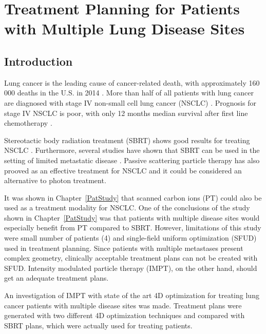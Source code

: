 \chapter{Treatment Planning for Patients with Multiple Lung Disease Sites}
\label{chapter:vmm}
\minitoc

\section{Introduction}

Lung cancer is the leading cause of cancer-related death, with approximately 160 000 deaths in the U.S. in 2014 \cite{Siegel2014}.
More than half of all patients with lung cancer are diagnosed with stage IV non-small cell lung cancer (NSCLC) \cite{Ramalingam2008, Iyengar2014}.
Prognosis for stage IV NSCLC is poor, with only 12 months median survival after first line chemotherapy \cite{Socinski2013}. 

Stereotactic body radiation treatment (SBRT) shows good results for treating NSCLC \cite{Baumann2009, Fakiris2009, Grutters2010, Greco2011}. 
Furthermore, several studies have shown that SBRT can be used in the setting of limited metastatic 
disease \cite{Rusthoven2009, Villaruz2012, Salama2012, Iyengar2014}. 
Passive scattering particle therapy has also prooved as an effective treatment for NSCLC \cite{Grutters2010, Tsujii2012} and it could be considered an alternative
to photon treatment.

It was shown in Chapter~\ref{PatStudy} that scanned carbon ions (PT) could also be used as a treatment modality for NSCLC. One of the conclusions of the study shown in Chapter~\ref{PatStudy} 
was that patients with multiple disease sites would especially benefit from PT compared to SBRT. However, limitations of this study were small number of patients (4) and single-field uniform optimization (SFUD) used in treatment planning. 
Since patients with multiple metastases present complex geometry, clinically acceptable treatment plans can not be created with SFUD. Intensity modulated particle therapy (IMPT), on the other hand,
should get an adequate treatment plans.

An investigation of IMPT with state of the art 4D optimization for treating lung cancer patients with multiple disease sites was made. 
Treatment plans were generated with two different 4D optimization techniques and compared with SBRT plans, which were actually used for treating patients.


\newpage
